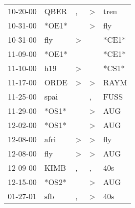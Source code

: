 \begin{supertabular}{p{0.07\textwidth}p{0.06\textwidth}p{0.02\textwidth}p{0.02\textwidth}p{0.06\textwidth}}
          10-20-00\textsuperscript{} &           QBER\textsuperscript{} &                , &     \textgreater &           tren\textsuperscript{} \\
          10-31-00\textsuperscript{} &                            *OE1* &                  &     \textgreater &            fly\textsuperscript{} \\
          10-31-00\textsuperscript{} &            fly\textsuperscript{} &     \textgreater &                  &                            *CE1* \\
          11-09-00\textsuperscript{} &                            *OE1* &                  &                  &                            *CE1* \\
          11-10-00\textsuperscript{} &            h19\textsuperscript{} &     \textgreater &                  &                            *CS1* \\
          11-17-00\textsuperscript{} &           ORDE\textsuperscript{} &     \textgreater &     \textgreater &           RAYM\textsuperscript{} \\
          11-25-00\textsuperscript{} &           spai\textsuperscript{} &                  &                , &           FUSS\textsuperscript{} \\
          11-29-00\textsuperscript{} &                            *OS1* &                  &     \textgreater &            AUG\textsuperscript{} \\
          12-02-00\textsuperscript{} &                            *OS1* &                  &     \textgreater &            AUG\textsuperscript{} \\
          12-08-00\textsuperscript{} &           afri\textsuperscript{} &     \textgreater &     \textgreater &            fly\textsuperscript{} \\
          12-08-00\textsuperscript{} &            fly\textsuperscript{} &     \textgreater &     \textgreater &            AUG\textsuperscript{} \\
          12-09-00\textsuperscript{} &           KIMB\textsuperscript{} &                , &                , &            40s\textsuperscript{} \\
          12-15-00\textsuperscript{} &                            *OS2* &                  &     \textgreater &            AUG\textsuperscript{} \\
          01-27-01\textsuperscript{} &            sfb\textsuperscript{} &                , &     \textgreater &            40s\textsuperscript{} \\

\end{supertabular}
